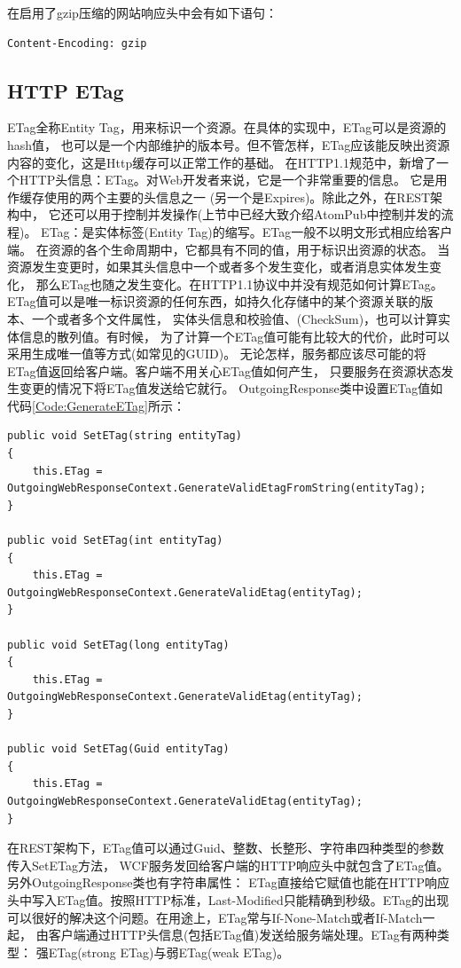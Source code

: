 \documentclass{book}
\begin{document}
在启用了gzip压缩的网站响应头中会有如下语句：

\begin{lstlisting}[language=HTML]
Content-Encoding: gzip
\end{lstlisting}

\subsection{HTTP ETag} 

ETag全称Entity Tag，用来标识一个资源。在具体的实现中，ETag可以是资源的hash值，
也可以是一个内部维护的版本号。但不管怎样，ETag应该能反映出资源内容的变化，这是Http缓存可以正常工作的基础。
在HTTP1.1规范中，新增了一个HTTP头信息：ETag。对Web开发者来说，它是一个非常重要的信息。
它是用作缓存使用的两个主要的头信息之一 (另一个是Expires)。除此之外，在REST架构中，
它还可以用于控制并发操作(上节中已经大致介绍AtomPub中控制并发的流程)。
ETag：是实体标签(Entity Tag)的缩写。ETag一般不以明文形式相应给客户端。
在资源的各个生命周期中，它都具有不同的值，用于标识出资源的状态。
当资源发生变更时，如果其头信息中一个或者多个发生变化，或者消息实体发生变化，
那么ETag也随之发生变化。在HTTP1.1协议中并没有规范如何计算ETag。
ETag值可以是唯一标识资源的任何东西，如持久化存储中的某个资源关联的版本、一个或者多个文件属性，
实体头信息和校验值、(CheckSum)，也可以计算实体信息的散列值。有时候，
为了计算一个ETag值可能有比较大的代价，此时可以采用生成唯一值等方式(如常见的GUID)。
无论怎样，服务都应该尽可能的将ETag值返回给客户端。客户端不用关心ETag值如何产生，
只要服务在资源状态发生变更的情况下将ETag值发送给它就行。
OutgoingResponse类中设置ETag值如代码\ref{Code:GenerateETag}所示：

\begin{lstlisting}[language={[Sharp]C},caption=生成ETag,label={Code:GenerateETag}]
public void SetETag(string entityTag)
{
	this.ETag = OutgoingWebResponseContext.GenerateValidEtagFromString(entityTag);
}

public void SetETag(int entityTag)
{
	this.ETag = OutgoingWebResponseContext.GenerateValidEtag(entityTag);
}

public void SetETag(long entityTag)
{
	this.ETag = OutgoingWebResponseContext.GenerateValidEtag(entityTag);
}

public void SetETag(Guid entityTag)
{
	this.ETag = OutgoingWebResponseContext.GenerateValidEtag(entityTag);
}
\end{lstlisting}

在REST架构下，ETag值可以通过Guid、整数、长整形、字符串四种类型的参数传入SetETag方法，
WCF服务发回给客户端的HTTP响应头中就包含了ETag值。另外OutgoingResponse类也有字符串属性：
ETag直接给它赋值也能在HTTP响应头中写入ETag值。按照HTTP标准，Last-Modified只能精确到秒级。ETag的出现可以很好的解决这个问题。在用途上，ETag常与If-None-Match或者If-Match一起，
由客户端通过HTTP头信息(包括ETag值)发送给服务端处理。ETag有两种类型：
强ETag(strong ETag)与弱ETag(weak ETag)。
\end{document}
